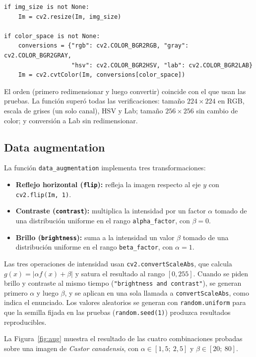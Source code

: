 \documentclass[11pt]{article}
\begin{document}
\begin{lstlisting}
if img_size is not None:
    Im = cv2.resize(Im, img_size)

if color_space is not None:
    conversions = {"rgb": cv2.COLOR_BGR2RGB, "gray": cv2.COLOR_BGR2GRAY,
                   "hsv": cv2.COLOR_BGR2HSV, "lab": cv2.COLOR_BGR2LAB}
    Im = cv2.cvtColor(Im, conversions[color_space])
\end{lstlisting}

El orden (primero redimensionar y luego convertir) coincide con el que usan las pruebas. La función superó todas las verificaciones: tamaño $224\times224$ en RGB, escala de grises (un solo canal), HSV y Lab; tamaño $256\times256$ sin cambio de color; y conversión a Lab sin redimensionar.

\subsection{Data augmentation}

La función \texttt{data\_augmentation} implementa tres transformaciones:

\begin{itemize}
  \item \textbf{Reflejo horizontal (\texttt{flip}):} refleja la imagen respecto al eje $y$ con \texttt{cv2.flip(Im, 1)}.
  \item \textbf{Contraste (\texttt{contrast}):} multiplica la intensidad por un factor $\alpha$ tomado de una distribución uniforme en el rango \texttt{alpha\_factor}, con $\beta=0$.
  \item \textbf{Brillo (\texttt{brightness}):} suma a la intensidad un valor $\beta$ tomado de una distribución uniforme en el rango \texttt{beta\_factor}, con $\alpha=1$.
\end{itemize}

Las tres operaciones de intensidad usan \texttt{cv2.convertScaleAbs}, que calcula $g(x) = |\alpha f(x) + \beta|$ y satura el resultado al rango $[0, 255]$. Cuando se piden brillo y contraste al mismo tiempo (\texttt{"brightness and contrast"}), se generan primero $\alpha$ y luego $\beta$, y se aplican en una sola llamada a \texttt{convertScaleAbs}, como indica el enunciado. Los valores aleatorios se generan con \texttt{random.uniform} para que la semilla fijada en las pruebas (\texttt{random.seed(1)}) produzca resultados reproducibles.

La Figura~\ref{fig:aug} muestra el resultado de las cuatro combinaciones probadas sobre una imagen de \emph{Castor canadensis}, con $\alpha \in [1{,}5;\ 2{,}5]$ y $\beta \in [20;\ 80]$.
\end{document}
